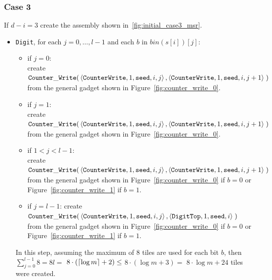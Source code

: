 \subsubsection{Case 3}
%
If $d - i = 3$ create the assembly shown in~\ref{fig:initial_case3_msr}.
%
\begin{itemize}

    \item {\tt Digit}, for each $j=0,\ldots,l-1$ and each $b$ in $bin(s[i])[j]$:
    \begin{itemize}
        \item if $j = 0$:\\ create
        $\begin{aligned}[t]
            \cwrite(&\left\langle {\tt CounterWrite}, 1, {\tt seed}, i, j \right\rangle, \left\langle {\tt CounterWrite}, 1, {\tt seed}, i, j + 1 \right\rangle \;)
        \end{aligned}$\\from the general gadget shown in Figure~\ref{fig:counter_write_0}.

        \item if $j = 1$:\\ create
        $\begin{aligned}[t]
            \cwrite(&\left\langle {\tt CounterWrite}, 1, {\tt seed}, i, j \right\rangle, \left\langle {\tt CounterWrite}, 1, {\tt seed}, i, j + 1 \right\rangle \;)
        \end{aligned}$\\from the general gadget shown in Figure~\ref{fig:counter_write_0}.

        \item if $1 < j < l-1$:\\ create
        $\begin{aligned}[t]
            \cwrite(&\left\langle {\tt CounterWrite}, 1, {\tt seed}, i, j \right\rangle, \left\langle {\tt CounterWrite}, 1, {\tt seed}, i, j + 1 \right\rangle \;)
        \end{aligned}$\\from the general gadget shown in Figure~\ref{fig:counter_write_0} if $b = 0$ or Figure~\ref{fig:counter_write_1} if $b = 1$.

        \item if $j = l-1$: create
        $\begin{aligned}[t]
            \cwrite(&\left\langle {\tt CounterWrite}, 1, {\tt seed}, i, j \right\rangle, \left\langle {\tt DigitTop}, 1, {\tt seed}, i \right\rangle \;)
        \end{aligned}$\\from the general gadget shown in Figure~\ref{fig:counter_write_0} if $b = 0$ or Figure~\ref{fig:counter_write_1} if $b = 1$.
    \end{itemize}
    In this step, assuming the maximum of 8 tiles are used for each bit $b$, then
    $\sum^{l-1}_{j=0} 8 = 8l =$
    $8 \cdot \left( \ceil*{\log m} + 2 \right) \leq$
    $8 \cdot \left( {\log m} + 3 \right) =$
    $8 \cdot {\log m} + 24$ tiles were created.


\end{itemize}

